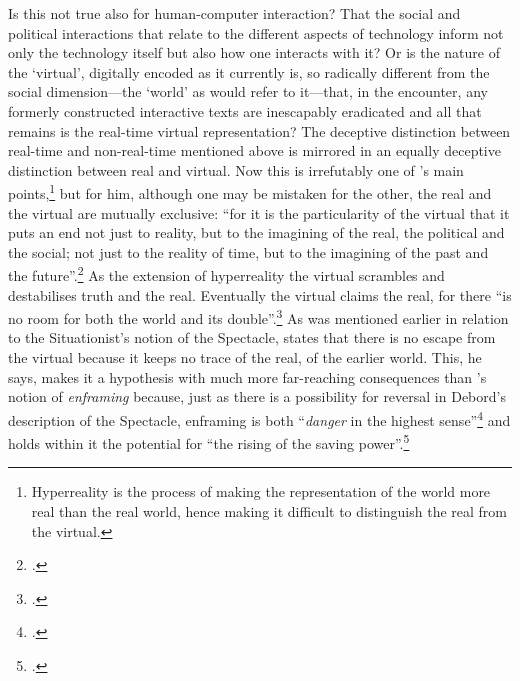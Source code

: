 Is this not true also for human-computer interaction? That the social and political interactions that relate to the different aspects of technology inform not only the technology itself but also how one interacts with it? Or is the nature of the `virtual', digitally encoded as it currently is, so radically different from the social dimension---the `world' as \citeauthor{baudrillard02} would refer to it---that, in the encounter, any formerly constructed interactive texts are inescapably eradicated and all that remains is the  real-time virtual representation? The deceptive distinction between real-time and non-real-time mentioned above is mirrored in an equally deceptive distinction between real and virtual. Now this is irrefutably one of \citeauthor{baudrillard02}'s main points,\footnote{Hyperreality is the process of making the representation of the world more real than the real world, hence making it difficult to distinguish the real from the virtual.} but for him, although one may be mistaken for the other, the real and the virtual are mutually exclusive: ``for it is the particularity of the virtual that it puts an end not just to reality, but to the imagining of the real, the political and the social; not just to the reality of time, but to the imagining of the past and the future''.\footcite[107]{baudrillard02} As the extension of hyperreality the virtual scrambles and destabilises truth and the real. Eventually the virtual claims the real, for there ``is no room for both the world and its double''.\footcite[34]{baudrillard96} As was mentioned earlier in relation to the Situationist's notion of the Spectacle, \citeauthor{baudrillard96} states that there is no escape from the virtual because it keeps no trace of the real, of the earlier world. This, he says, makes it a hypothesis with much more far-reaching consequences than \citeauthor{heidegger93}'s notion of \emph{enframing} because, just as there is a possibility for reversal in Debord's description of the Spectacle, enframing is both ``\emph{danger} in the highest sense''\footcite[333]{heidegger93} and holds within it the potential for ``the rising of the saving power''.\footcite[338]{heidegger93}

